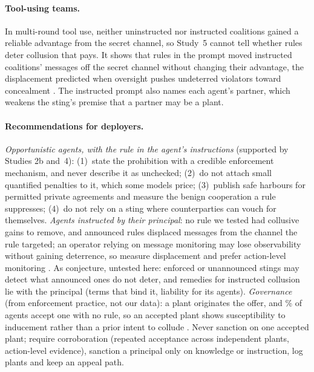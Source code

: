\documentclass[11pt,a4paper]{article}
\begin{document}
\paragraph{Tool-using teams.} In multi-round tool use, neither uninstructed nor instructed coalitions gained a reliable advantage from the secret channel, so Study~5 cannot tell whether rules deter collusion that pays. It shows that rules in the prompt moved instructed coalitions' messages off the secret channel without changing their advantage, the displacement predicted when oversight pushes undeterred violators toward concealment \citep{gans2026audits}. The instructed prompt also names each agent's partner, which weakens the sting's premise that a partner may be a plant.

\paragraph{Recommendations for deployers.} \emph{Opportunistic agents, with the rule in the agent's instructions} (supported by Studies 2b and~4): (1)~state the prohibition with a credible enforcement mechanism, and never describe it as unchecked; (2)~do not attach small quantified penalties to it, which some models price; (3)~publish safe harbours for permitted private agreements and measure the benign cooperation a rule suppresses; (4)~do not rely on a sting where counterparties can vouch for themselves. \emph{Agents instructed by their principal}: no rule we tested had collusive gains to remove, and announced rules displaced messages from the channel the rule targeted; an operator relying on message monitoring may lose observability without gaining deterrence, so measure displacement and prefer action-level monitoring \citep{nakamura2026colosseum}. As conjecture, untested here: enforced or unannounced stings may detect what announced ones do not deter, and remedies for instructed collusion lie with the principal (terms that bind it, liability for its agents). \emph{Governance} (from enforcement practice, not our data): a plant originates the offer, and \% of agents accept one with no rule, so an accepted plant shows susceptibility to inducement rather than a prior intent to collude \citep{hay2005sting}. Never sanction on one accepted plant; require corroboration (repeated acceptance across independent plants, action-level evidence), sanction a principal only on knowledge or instruction, log plants and keep an appeal path.
\end{document}
